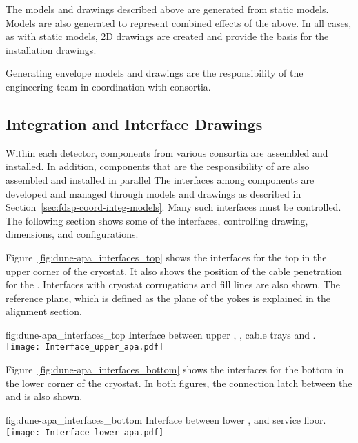 The models and drawings described above are generated from static
models. Models are also generated to represent combined effects of the
above. In all cases, as with static models, 2D drawings are created
and provide the basis for the installation drawings.


Generating envelope models and drawings are the responsibility of the
 engineering team in coordination with consortia.


\subsection{Integration and Interface Drawings}
\label{sec:fdsp-coord-integ-drawings}

Within each detector, components from various consortia are assembled
and installed. In addition, components that are the responsibility of
 are also assembled and installed in parallel The interfaces
among components are developed and managed through models and drawings
as described in Section~\ref{sec:fdsp-coord-integ-models}. Many such
interfaces must be controlled. The following section shows some of the
interfaces, controlling drawing, dimensions, and configurations.


Figure~\ref{fig:dune-apa_interfaces_top} shows the interfaces for the
top  in the upper corner of the cryostat. It also shows the position
of the cable penetration for the . Interfaces with cryostat
corrugations and  fill lines are also shown. The reference plane,
which is defined as the plane of the  yokes is explained in the
alignment section.
\begin{dunefigure}{fig:dune-apa_interfaces_top}
  {Interface between upper , , cable
    trays and .}
  \texttt{[image: Interface\_upper\_apa.pdf]}
\end{dunefigure}


Figure~\ref{fig:dune-apa_interfaces_bottom} shows the interfaces for
the bottom  in the lower corner of the cryostat. In both figures,
the connection latch between the  and  is also
shown.
\begin{dunefigure}{fig:dune-apa_interfaces_bottom}
  {Interface between lower ,  and 
    service floor.}
  \texttt{[image: Interface\_lower\_apa.pdf]}
\end{dunefigure}


